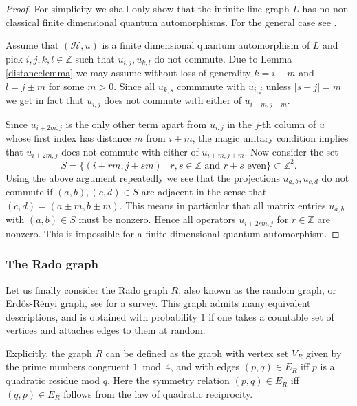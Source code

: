 \documentclass[a4paper]{amsart}
\newcommand*{\Hc}{\mathcal{H}}
\numberwithin{equation}{section}
\theoremstyle{change}
\begin{document}
\begin{proof} 
For simplicity we shall only show that the infinite line graph $ L $ has no non-classical finite dimensional quantum automorphisms. For the general case see \cite[Proposition 7.9]{VOIGT_infinitequantumpermutations}. 

Assume that $ (\Hc,u) $ is a finite dimensional quantum automorphism  of $ L $ and pick $ i,j,k,l \in \mathbb{Z} $ such that $ u_{i,j}, u_{k,l} $ do not commute. 
Due to Lemma \ref{distancelemma} we may assume without loss of generality $ k = i + m $ and $ l = j \pm m $ for some $ m > 0 $. 
Since all $ u_{k,s} $ commmute with $ u_{i,j} $ unless $ |s - j| = m $ we get in fact that $ u_{i,j} $ does not commute with either of $ u_{i + m, j \pm m} $. 

Since $ u_{i + 2m, j} $ is the only other term apart from $ u_{i,j} $ in the $ j $-th column of $ u $ whose first index has distance $ m $ from $ i + m $, 
the magic unitary condition implies that $ u_{i + 2m, j} $ does not commute with either of $ u_{i + m, j \pm m} $. Now consider the set
$$
S = \{(i + rm, j + sm) \mid r, s \in \mathbb{Z} \text{ and } r + s \text{ even} \} \subset \mathbb{Z}^2.  
$$
Using the above argument repeatedly we see that the projections $ u_{a,b}, u_{c,d} $ do not commute if $ (a,b), (c,d) \in S $ are adjacent in the sense that $ (c,d) = (a \pm m, b \pm m) $. This means in particular that all matrix entries $ u_{a,b} $ with $ (a,b) \in S $ must be nonzero. 
Hence all operators $ u_{i + 2rm, j} $ for $ r \in \mathbb{Z} $ are nonzero. 
This is impossible for a finite dimensional quantum automorphism. 
\end{proof} 



\subsubsection{The Rado graph} 

Let us finally consider the Rado graph $ R $, also known as the random graph, or Erd\H{o}s-R\'enyi graph, see \cite{CAMERON_randomgraphrevisited} for a survey. 
This graph admits many equivalent descriptions, and is obtained with probability $ 1 $ if one 
takes a countable set of vertices and attaches edges to them at random. 

Explicitly, the graph $ R $ can be defined as the graph with vertex set $ V_R $ given by the prime numbers congruent $ 1 \bmod 4 $, 
and with edges $ (p,q) \in E_R $ iff $ p $ is a quadratic residue mod $ q $. Here the symmetry relation $ (p,q) \in E_R $ iff $ (q,p) \in E_R $ follows from 
the law of quadratic reciprocity. 
\end{document}
